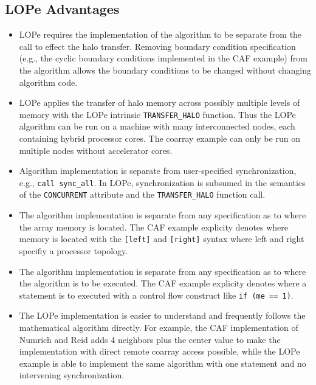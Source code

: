 
\subsection{LOPe Advantages}

\begin{itemize}

\item
LOPe requires the implementation of the algorithm to be separate from the call to effect the halo
transfer.  Removing boundary condition specification (e.g., the cyclic boundary conditions
implemented in the CAF example) from the algorithm allows the boundary conditions to be changed
without changing algorithm code.

\item
LOPe applies the transfer of halo memory across possibly multiple levels of memory with the LOPe
intrinsic \texttt{TRANSFER\_HALO} function.  Thus the LOPe algorithm can be run on a machine with
many interconnected nodes, each containing hybrid processor cores.  The coarray example can only be
run on multiple nodes without accelerator cores.

\item
Algorithm implementation is separate from user-specified synchronization, e.g., \texttt{call
  sync\_all}.  In LOPe, synchronization is subsumed in the semantics of the \texttt{CONCURRENT}
attribute and the \texttt{TRANSFER\_HALO} function call.

\item
The algorithm implementation is separate from any specification as to where the array
memory is located.  The CAF example explicity denotes where memory is located with the
\texttt{[left]} and \texttt{[right]} syntax where left and right specifiy a processor
topology.

\item
The algorithm implementation is separate from any specification as to where the algorithm
is to be executed.  The CAF example explicity denotes where a statement is to executed
with a control flow construct like \texttt{if (me == 1)}.

\item
The LOPe implementation is easier to understand and frequently follows the mathematical algorithm
directly.  For example, the CAF implementation of Numrich and Reid adds 4 neighbors plus the center
value to make the implementation with direct remote coarray access possible, while the LOPe example
is able to implement the same algorithm with one statement and no intervening synchronization.


\end{itemize}
